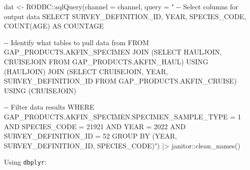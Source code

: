\documentclass[
  letterpaper,
  oneside,
  open=any]{scrbook}
\newenvironment{Shaded}{\begin{snugshade}}{\end{snugshade}}
\newcommand{\AttributeTok}[1]{\textcolor[rgb]{0.40,0.45,0.13}{#1}}
\newcommand{\FunctionTok}[1]{\textcolor[rgb]{0.28,0.35,0.67}{#1}}
\newcommand{\NormalTok}[1]{\textcolor[rgb]{0.00,0.23,0.31}{#1}}
\newcommand{\OtherTok}[1]{\textcolor[rgb]{0.00,0.23,0.31}{#1}}
\newcommand{\SpecialCharTok}[1]{\textcolor[rgb]{0.37,0.37,0.37}{#1}}
\newcommand{\StringTok}[1]{\textcolor[rgb]{0.13,0.47,0.30}{#1}}
\begin{document}
\begin{Shaded}
\begin{Highlighting}[]
\NormalTok{dat }\OtherTok{\textless{}{-}}\NormalTok{ RODBC}\SpecialCharTok{::}\FunctionTok{sqlQuery}\NormalTok{(}\AttributeTok{channel =}\NormalTok{ channel,}
                       \AttributeTok{query =} \StringTok{"}
\StringTok{{-}{-} Select columns for output data}
\StringTok{SELECT SURVEY\_DEFINITION\_ID, YEAR, SPECIES\_CODE, }
\StringTok{COUNT(AGE) AS COUNTAGE}

\StringTok{{-}{-} Identify what tables to pull data from}
\StringTok{FROM GAP\_PRODUCTS.AKFIN\_SPECIMEN}
\StringTok{JOIN (SELECT HAULJOIN, CRUISEJOIN FROM GAP\_PRODUCTS.AKFIN\_HAUL)}
\StringTok{USING (HAULJOIN)}
\StringTok{JOIN (SELECT CRUISEJOIN, YEAR, SURVEY\_DEFINITION\_ID FROM GAP\_PRODUCTS.AKFIN\_CRUISE)}
\StringTok{USING (CRUISEJOIN)}

\StringTok{{-}{-} Filter data results}
\StringTok{WHERE GAP\_PRODUCTS.AKFIN\_SPECIMEN.SPECIMEN\_SAMPLE\_TYPE = 1}
\StringTok{AND SPECIES\_CODE = 21921}
\StringTok{AND YEAR = 2022}
\StringTok{AND SURVEY\_DEFINITION\_ID = 52}
\StringTok{GROUP BY (YEAR, SURVEY\_DEFINITION\_ID, SPECIES\_CODE)"}\NormalTok{) }\SpecialCharTok{|\textgreater{}} 
\NormalTok{  janitor}\SpecialCharTok{::}\FunctionTok{clean\_names}\NormalTok{()}
\end{Highlighting}
\end{Shaded}

Using \texttt{dbplyr}:
\end{document}
